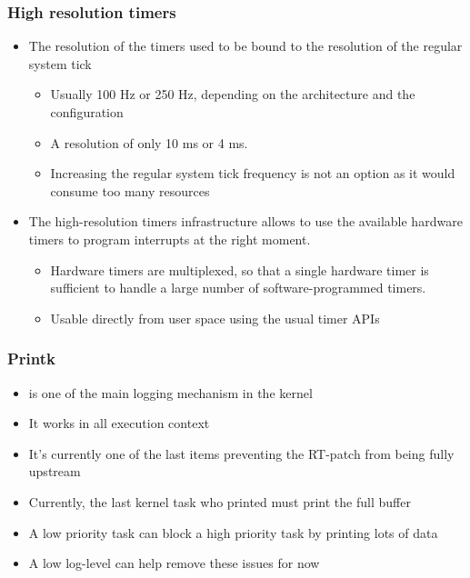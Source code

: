 \begin{frame}
  \frametitle{High resolution timers}
  \begin{itemize}
  \item The resolution of the timers used to be bound to the
    resolution of the regular system tick
    \begin{itemize}
    \item Usually 100 Hz or 250 Hz, depending on the architecture and
      the configuration
    \item A resolution of only 10 ms or 4 ms.
    \item Increasing the regular system tick frequency is not an
      option as it would consume too many resources
    \end{itemize}
  \item The high-resolution timers infrastructure allows to use
    the available hardware timers to program interrupts
    at the right moment.
    \begin{itemize}
    \item Hardware timers are multiplexed, so that a single hardware
      timer is sufficient to handle a large number of
      software-programmed timers.
    \item Usable directly from user space using the usual timer APIs
    \end{itemize}
  \end{itemize}
\end{frame}

\begin{frame}
  \frametitle{Printk}
	\begin{itemize}
		\item {} is one of the main logging mechanism in the kernel
		\item It works in all execution context
		\item It's currently one of the last items preventing the RT-patch from being fully upstream
		\item Currently, the last kernel task who printed must print the full buffer
		\item A low priority task can block a high priority task by printing lots of data
		\item A low log-level can help remove these issues for now
	\end{itemize}
\end{frame}

